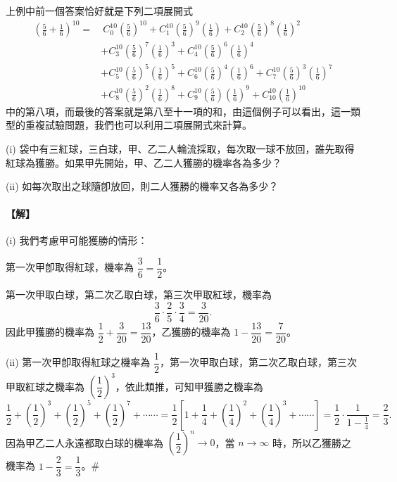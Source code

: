 上例中前一個答案恰好就是下列二項展開式
\begin{align*}
\left(\frac{5}{6} + \frac{1}{6}\right)^{10} = & \ C_0^{10} \left(\frac{5}{6}\right)^{10} + C_1^{10} \left(\frac{5}{6}\right)^9 \left(\frac{1}{6}\right) + C_2^{10} \left(\frac{5}{6}\right)^8 \left(\frac{1}{6}\right)^2 \\
& + C_3^{10} \left(\frac{5}{6}\right)^7 \left(\frac{1}{6}\right)^3 + C_4^{10} \left(\frac{5}{6}\right)^6 \left(\frac{1}{6}\right)^4 \\
& + C_5^{10} \left(\frac{5}{6}\right)^5 \left(\frac{1}{6}\right)^5 + C_6^{10} \left(\frac{5}{6}\right)^4 \left(\frac{1}{6}\right)^6 + C_7^{10} \left(\frac{5}{6}\right)^3 \left(\frac{1}{6}\right)^7 \\
& + C_8^{10} \left(\frac{5}{6}\right)^2 \left(\frac{1}{6}\right)^8 + C_9^{10} \left(\frac{5}{6}\right) \left(\frac{1}{6}\right)^9 + C_{10}^{10} \left(\frac{1}{6}\right)^{10}
\end{align*}
中的第八項，而最後的答案就是第八至十一項的和，由這個例子可以看出，這一類型的重複試驗問題，我們也可以利用二項展開式來計算。

\vspace{1em}
\begin{discussion}\label{disc:b5-3-7}
(i) 袋中有三紅球，三白球，甲、乙二人輪流採取，每次取一球不放回，誰先取得紅球為獲勝。如果甲先開始，甲、乙二人獲勝的機率各為多少？

(ii) 如每次取出之球隨卽放回，則二人獲勝的機率又各為多少？
\end{discussion}
\paragraph{【解】}
(i) 我們考慮甲可能獲勝的情形：

第一次甲卽取得紅球，機率為 $\dfrac{3}{6} = \dfrac{1}{2}$。

第一次甲取白球，第二次乙取白球，第三次甲取紅球，機率為
\[
\frac{3}{6} \cdot \frac{2}{5} \cdot \frac{3}{4} = \frac{3}{20}.
\]
因此甲獲勝的機率為 $\dfrac{1}{2} + \dfrac{3}{20} = \dfrac{13}{20}$，乙獲勝的機率為 $1 - \dfrac{13}{20} = \dfrac{7}{20}$。

(ii) 第一次甲卽取得紅球之機率為 $\dfrac{1}{2}$，第一次甲取白球，第二次乙取白球，第三次甲取紅球之機率為 $\left(\dfrac{1}{2}\right)^3$，依此類推，可知甲獲勝之機率為
\[
\frac{1}{2} + \left(\frac{1}{2}\right)^3 + \left(\frac{1}{2}\right)^5 + \left(\frac{1}{2}\right)^7 + \cdots\cdots = \frac{1}{2}\left[1 + \frac{1}{4} + \left(\frac{1}{4}\right)^2 + \left(\frac{1}{4}\right)^3 + \cdots\cdots\right] = \frac{1}{2} \cdot \frac{1}{1 - \frac{1}{4}} = \frac{2}{3}.
\]
因為甲乙二人永遠都取白球的機率為 $\left(\dfrac{1}{2}\right)^n \longrightarrow 0$，當 $n \longrightarrow \infty$ 時，所以乙獲勝之機率為 $1 - \dfrac{2}{3} = \dfrac{1}{3}$。\hfill\#

